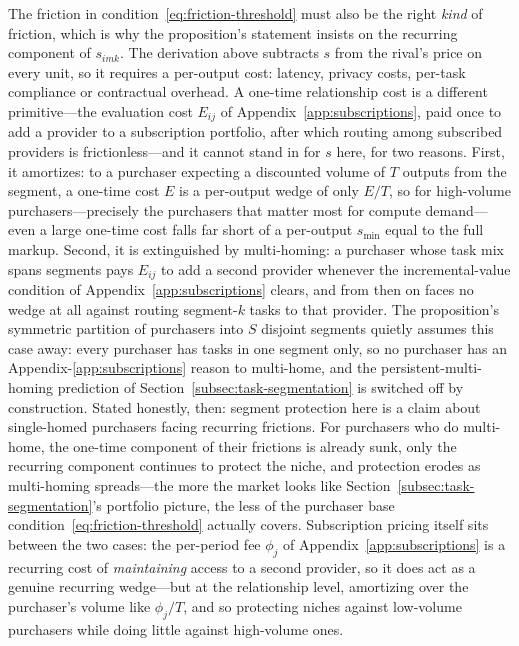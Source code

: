 \documentclass[11pt]{article}
\begin{document}
The friction in condition~\eqref{eq:friction-threshold} must also be the right \emph{kind} of friction, which is why the proposition's statement insists on the recurring component of $s_{imk}$. The derivation above subtracts $s$ from the rival's price on every unit, so it requires a per-output cost: latency, privacy costs, per-task compliance or contractual overhead. A one-time relationship cost is a different primitive---the evaluation cost $E_{ij}$ of Appendix~\ref{app:subscriptions}, paid once to add a provider to a subscription portfolio, after which routing among subscribed providers is frictionless---and it cannot stand in for $s$ here, for two reasons. First, it amortizes: to a purchaser expecting a discounted volume of $T$ outputs from the segment, a one-time cost $E$ is a per-output wedge of only $E/T$, so for high-volume purchasers---precisely the purchasers that matter most for compute demand---even a large one-time cost falls far short of a per-output $s_{\min}$ equal to the full markup. Second, it is extinguished by multi-homing: a purchaser whose task mix spans segments pays $E_{ij}$ to add a second provider whenever the incremental-value condition of Appendix~\ref{app:subscriptions} clears, and from then on faces no wedge at all against routing segment-$k$ tasks to that provider. The proposition's symmetric partition of purchasers into $S$ disjoint segments quietly assumes this case away: every purchaser has tasks in one segment only, so no purchaser has an Appendix-\ref{app:subscriptions} reason to multi-home, and the persistent-multi-homing prediction of Section~\ref{subsec:task-segmentation} is switched off by construction. Stated honestly, then: segment protection here is a claim about single-homed purchasers facing recurring frictions. For purchasers who do multi-home, the one-time component of their frictions is already sunk, only the recurring component continues to protect the niche, and protection erodes as multi-homing spreads---the more the market looks like Section~\ref{subsec:task-segmentation}'s portfolio picture, the less of the purchaser base condition~\eqref{eq:friction-threshold} actually covers. Subscription pricing itself sits between the two cases: the per-period fee $\phi_j$ of Appendix~\ref{app:subscriptions} is a recurring cost of \emph{maintaining} access to a second provider, so it does act as a genuine recurring wedge---but at the relationship level, amortizing over the purchaser's volume like $\phi_j/T$, and so protecting niches against low-volume purchasers while doing little against high-volume ones.
\end{document}
